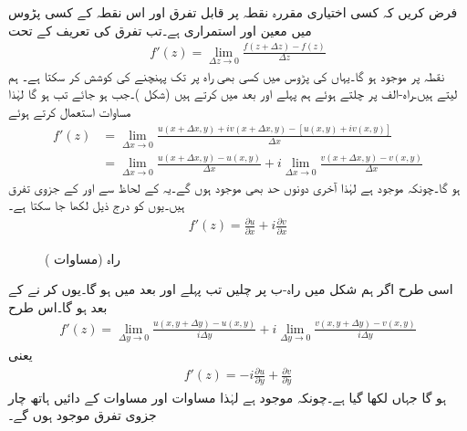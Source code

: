 فرض کریں کہ  کسی اختیاری مقررہ نقطہ  پر قابل تفرق اور اس نقطہ کے کسی پڑوس میں معین اور استمراری ہے۔تب تفرق کی تعریف کے تحت
\begin{align}\label{مساوات_مخلوط_کوشی_ریمان_ثبوت_ب}
f'(z)=\lim_{\Delta z\to 0}\frac{f(z+\Delta z)-f(z)}{\Delta z}
\end{align} 
نقطہ  پر موجود ہو گا۔یہاں  کی پڑوس میں  کسی بھی راہ پر   تک پہنچنے کی کوشش کر سکتا ہے۔  ہم  لیتے ہیں۔راہ-الف پر چلتے ہوئے ہم پہلے  اور بعد میں  کرتے ہیں (شکل )۔جب  ہو جائے تب  ہو گا لہٰذا مساوات  استعمال کرتے ہوئے
\begin{align*}
f'(z)&=\lim_{\Delta x\to 0}\frac{u(x+\Delta x,y)+iv(x+\Delta x,y)-[u(x,y)+iv(x,y)]}{\Delta x}\\
&=\lim_{\Delta x\to 0}\frac{u(x+\Delta x,y)-u(x,y)}{\Delta x}+i\lim_{\Delta x\to 0}\frac{v(x+\Delta x,y)-v(x,y)}{\Delta x}
\end{align*}
ہو گا۔چونکہ  موجود ہے لہٰذا آخری دونوں حد بھی موجود ہوں گے۔یہ  کے لحاظ سے  اور  کے جزوی تفرق ہیں۔یوں  کو درج ذیل لکھا جا سکتا ہے۔
\begin{align}\label{مساوات_مخلوط_کوشی_ریمان_ثبوت_پ}
f'(z)=\frac{\partial u}{\partial x}+i\frac{\partial v}{\partial x}
\end{align}
%
\begin{figure}
\centering
{}
\caption{راہ (مساوات )}
\label{شکل_مساوات_مخلوط_کوشی_ریمان_ثبوت_ب}
\end{figure}
اسی طرح اگر ہم شکل  میں راہ-ب پر چلیں تب پہلے  اور بعد میں  ہو گا۔یوں  کر نے کے بعد  ہو گا۔اس طرح 
\begin{align*}
f'(z)=\lim_{\Delta y\to 0} \frac{u(x,y+\Delta y)-u(x,y)}{i\Delta y}+i\lim_{\Delta y\to 0} \frac{v(x,y+\Delta y)-v(x,y)}{i\Delta y}
\end{align*}
یعنی
\begin{align}\label{مساوات_مخلوط_کوشی_ریمان_ثبوت_ت}
f'(z)=-i\frac{\partial u}{\partial y}+\frac{\partial v}{\partial y}
\end{align}
ہو گا جہاں  لکھا گیا ہے۔چونکہ   موجود ہے لہٰذا  مساوات  اور مساوات  کے دائیں ہاتھ چار جزوی تفرق موجود ہوں گے۔

